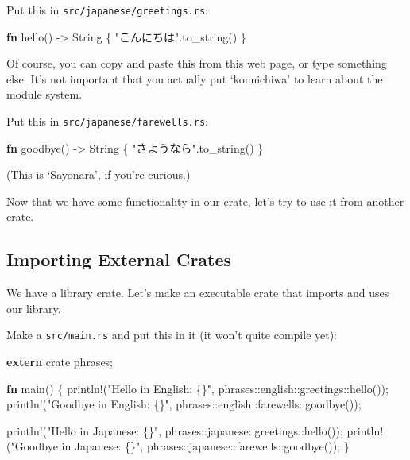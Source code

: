 \documentclass[a4paper,]{book}
\newenvironment{Shaded}{\begin{snugshade}}{\end{snugshade}}
\newcommand{\KeywordTok}[1]{\textcolor[rgb]{0.13,0.29,0.53}{\textbf{{#1}}}}
\newcommand{\StringTok}[1]{\textcolor[rgb]{0.31,0.60,0.02}{{#1}}}
\newcommand{\OtherTok}[1]{\textcolor[rgb]{0.56,0.35,0.01}{{#1}}}
\newcommand{\NormalTok}[1]{{#1}}
\begin{document}
Put this in \texttt{src/japanese/greetings.rs}:

\begin{Shaded}
\begin{Highlighting}[]
\KeywordTok{fn} \NormalTok{hello() -> String \{}
    \StringTok{"こんにちは"}\NormalTok{.to_string()}
\NormalTok{\}}
\end{Highlighting}
\end{Shaded}

Of course, you can copy and paste this from this web page, or type
something else. It's not important that you actually put `konnichiwa' to
learn about the module system.

Put this in \texttt{src/japanese/farewells.rs}:

\begin{Shaded}
\begin{Highlighting}[]
\KeywordTok{fn} \NormalTok{goodbye() -> String \{}
    \StringTok{"さようなら"}\NormalTok{.to_string()}
\NormalTok{\}}
\end{Highlighting}
\end{Shaded}

(This is `Sayōnara', if you're curious.)

Now that we have some functionality in our crate, let's try to use it
from another crate.

\subsection{Importing External Crates}\label{importing-external-crates}

We have a library crate. Let's make an executable crate that imports and
uses our library.

Make a \texttt{src/main.rs} and put this in it (it won't quite compile
yet):

\begin{Shaded}
\begin{Highlighting}[]
\KeywordTok{extern} \NormalTok{crate phrases;}

\KeywordTok{fn} \NormalTok{main() \{}
    \OtherTok{println!}\NormalTok{(}\StringTok{"Hello in English: \{\}"}\NormalTok{, phrases::english::greetings::hello());}
    \OtherTok{println!}\NormalTok{(}\StringTok{"Goodbye in English: \{\}"}\NormalTok{, phrases::english::farewells::goodbye());}

    \OtherTok{println!}\NormalTok{(}\StringTok{"Hello in Japanese: \{\}"}\NormalTok{, phrases::japanese::greetings::hello());}
    \OtherTok{println!}\NormalTok{(}\StringTok{"Goodbye in Japanese: \{\}"}\NormalTok{, phrases::japanese::farewells::goodbye());}
\NormalTok{\}}
\end{Highlighting}
\end{Shaded}
\end{document}
